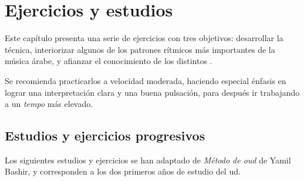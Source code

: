 \label{ejercicios}
\chapter{Ejercicios y estudios}


Este capítulo presenta una serie de ejercicios con tres objetivos: desarrollar la técnica, interiorizar algunos de los patrones rítmicos más importantes de la música árabe, y afianzar el conocimiento de los distintos \maqamaatb.

Se recomienda practicarlos a velocidad moderada, haciendo especial énfasis en lograr una interpretación clara y una buena pulsación, para después ir trabajando a un \emph{tempo} más elevado.

\section{Estudios y ejercicios progresivos}

Los siguientes estudios y ejercicios se han adaptado de \emph{Método de oud} de Yamil Bashir, y corresponden a los dos primeros años de estudio del ud.

\newexercise{}


\begin{center}
\end{center}


\newexercise{}


\begin{center}
\end{center}


\newexercise{}


\begin{center}
\end{center}


